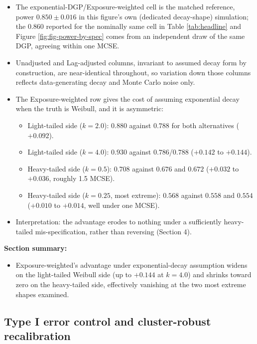 \documentclass[
  11pt,
]{article}
\providecommand{\tightlist}{%
  \setlength{\itemsep}{0pt}\setlength{\parskip}{0pt}}
\begin{document}
\begin{itemize}
\tightlist
\item
  The exponential-DGP/Exposure-weighted cell is the matched reference,
  power \(0.850 \pm 0.016\) in this figure's own (dedicated
  decay-shape) simulation; the \(0.860\) reported for the nominally
  same cell in Table \ref{tab:headline} and Figure
  \ref{fig:fig-power-by-spec} comes from an independent draw of the
  same DGP, agreeing within one MCSE.
\item
  Unadjusted and Lag-adjusted columns, invariant to assumed decay form
  by construction, are near-identical throughout, so variation down
  those columns reflects data-generating decay and Monte Carlo noise
  only.
\item
  The Exposure-weighted row gives the cost of assuming exponential
  decay when the truth is Weibull, and it is asymmetric:

  \begin{itemize}
  \tightlist
  \item
    Light-tailed side (\(k=2.0\)): \(0.880\) against \(0.788\) for both
    alternatives (\(+0.092\)).
  \item
    Light-tailed side (\(k=4.0\)): \(0.930\) against \(0.786\)/\(0.788\)
    (\(+0.142\) to \(+0.144\)).
  \item
    Heavy-tailed side (\(k=0.5\)): \(0.708\) against \(0.676\) and
    \(0.672\) (\(+0.032\) to \(+0.036\), roughly 1.5 MCSE).
  \item
    Heavy-tailed side (\(k=0.25\), most extreme): \(0.568\) against
    \(0.558\) and \(0.554\) (\(+0.010\) to \(+0.014\), well under one MCSE).
  \end{itemize}
\item
  Interpretation: the advantage erodes to nothing under a sufficiently
  heavy-tailed mis-specification, rather than reversing (Section 4).
\end{itemize}

\textbf{Section summary:}

\begin{itemize}
\tightlist
\item
  Exposure-weighted's advantage under exponential-decay assumption
  widens on the light-tailed Weibull side (up to \(+0.144\) at \(k=4.0\))
  and shrinks toward zero on the heavy-tailed side, effectively
  vanishing at the two most extreme shapes examined.
\end{itemize}

\subsection{Type I error control and cluster-robust recalibration}\label{type-i-error-control-and-cluster-robust-recalibration}
\end{document}
